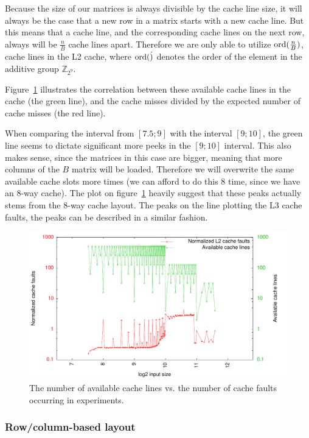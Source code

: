Because the size of our matrices is always divisible by the cache line
size, it will always be the case that a new row in a matrix starts
with a new cache line. But this means that a cache line, and the
corresponding cache lines on the next row, always will be
$\frac{n}{B}$ cache lines apart. Therefore we are only able to utilize
$\operatorname{ord}(\frac{n}{B})$, cache lines in the L2 cache, where $\operatorname{ord}(\dot)$
denotes the order of the element in the additive group
$\mathbb{Z}_{2^9}$.

Figure~\ref{fig:rowrow_cachepeaks} illustrates the correlation between
these available cache lines in the cache (the green line), and the
cache misses divided by the expected number of cache misses (the red
line).

When comparing the interval from $[7.5; 9]$ with the interval $[9;
  10]$, the green line seems to dictate significant more peeks in the
$[9; 10]$ interval. This also makes sense, since the matrices in this
case are bigger, meaning that more columns of the $B$ matrix will be
loaded. Therefore we will overwrite the same available cache slots
more times (we can afford to do this 8 time, since we have an 8-way
cache). The plot on figure~\ref{fig:rowrow_cachepeaks} heavily suggest
that these peaks actually stems from the 8-way cache layout.  The
peaks on the line plotting the L3 cache faults, the peaks can be
described in a similar fashion.

\begin{figure}[h!]
  \centering
  \includegraphics{plots/rowrow_cachepeaks}
  \caption{The number of available cache lines vs. the number of cache
    faults occurring in experiments.}
  \label{fig:rowrow_cachepeaks}
\end{figure}

\subsubsection{Row/column-based layout}

